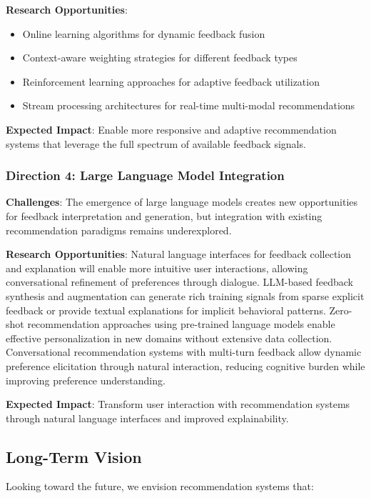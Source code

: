 \textbf{Research Opportunities}:
\begin{itemize}
    \item Online learning algorithms for dynamic feedback fusion
    \item Context-aware weighting strategies for different feedback types
    \item Reinforcement learning approaches for adaptive feedback utilization
    \item Stream processing architectures for real-time multi-modal recommendations
\end{itemize}

\textbf{Expected Impact}: Enable more responsive and adaptive recommendation systems that leverage the full spectrum of available feedback signals.

\subsubsection{Direction 4: Large Language Model Integration}

\textbf{Challenges}:
The emergence of large language models creates new opportunities for feedback interpretation and generation, but integration with existing recommendation paradigms remains underexplored.

\textbf{Research Opportunities}: Natural language interfaces for feedback collection and explanation will enable more intuitive user interactions, allowing conversational refinement of preferences through dialogue. LLM-based feedback synthesis and augmentation can generate rich training signals from sparse explicit feedback or provide textual explanations for implicit behavioral patterns. Zero-shot recommendation approaches using pre-trained language models enable effective personalization in new domains without extensive data collection. Conversational recommendation systems with multi-turn feedback allow dynamic preference elicitation through natural interaction, reducing cognitive burden while improving preference understanding.

\textbf{Expected Impact}: Transform user interaction with recommendation systems through natural language interfaces and improved explainability.

\subsection{Long-Term Vision}

Looking toward the future, we envision recommendation systems that:

